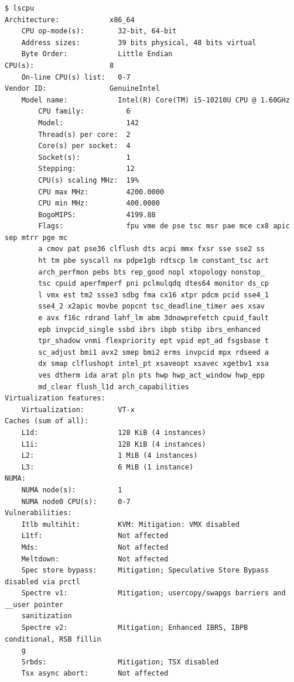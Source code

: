 \documentclass[12pt]{article}
\begin{document}
\singlespacing
\begin{lstlisting}[caption={Specification of system from \texttt{lscpu} and \texttt{dmidecode}}]
$ lscpu
Architecture:            x86_64
	CPU op-mode(s):        32-bit, 64-bit
	Address sizes:         39 bits physical, 48 bits virtual
	Byte Order:            Little Endian
CPU(s):                  8
	On-line CPU(s) list:   0-7
Vendor ID:               GenuineIntel
	Model name:            Intel(R) Core(TM) i5-10210U CPU @ 1.60GHz
		CPU family:          6
		Model:               142
		Thread(s) per core:  2
		Core(s) per socket:  4
		Socket(s):           1
		Stepping:            12
		CPU(s) scaling MHz:  19%
		CPU max MHz:         4200.0000
		CPU min MHz:         400.0000
		BogoMIPS:            4199.88
		Flags:               fpu vme de pse tsc msr pae mce cx8 apic sep mtrr pge mc
		a cmov pat pse36 clflush dts acpi mmx fxsr sse sse2 ss 
		ht tm pbe syscall nx pdpe1gb rdtscp lm constant_tsc art
		arch_perfmon pebs bts rep_good nopl xtopology nonstop_
		tsc cpuid aperfmperf pni pclmulqdq dtes64 monitor ds_cp
		l vmx est tm2 ssse3 sdbg fma cx16 xtpr pdcm pcid sse4_1
		sse4_2 x2apic movbe popcnt tsc_deadline_timer aes xsav
		e avx f16c rdrand lahf_lm abm 3dnowprefetch cpuid_fault
		epb invpcid_single ssbd ibrs ibpb stibp ibrs_enhanced 
		tpr_shadow vnmi flexpriority ept vpid ept_ad fsgsbase t
		sc_adjust bmi1 avx2 smep bmi2 erms invpcid mpx rdseed a
		dx smap clflushopt intel_pt xsaveopt xsavec xgetbv1 xsa
		ves dtherm ida arat pln pts hwp hwp_act_window hwp_epp 
		md_clear flush_l1d arch_capabilities
Virtualization features: 
	Virtualization:        VT-x
Caches (sum of all):     
	L1d:                   128 KiB (4 instances)
	L1i:                   128 KiB (4 instances)
	L2:                    1 MiB (4 instances)
	L3:                    6 MiB (1 instance)
NUMA:                    
	NUMA node(s):          1
	NUMA node0 CPU(s):     0-7
Vulnerabilities:         
	Itlb multihit:         KVM: Mitigation: VMX disabled
	L1tf:                  Not affected
	Mds:                   Not affected
	Meltdown:              Not affected
	Spec store bypass:     Mitigation; Speculative Store Bypass disabled via prctl
	Spectre v1:            Mitigation; usercopy/swapgs barriers and __user pointer
	sanitization
	Spectre v2:            Mitigation; Enhanced IBRS, IBPB conditional, RSB fillin
	g
	Srbds:                 Mitigation; TSX disabled
	Tsx async abort:       Not affected


\end{lstlisting}
\end{document}
